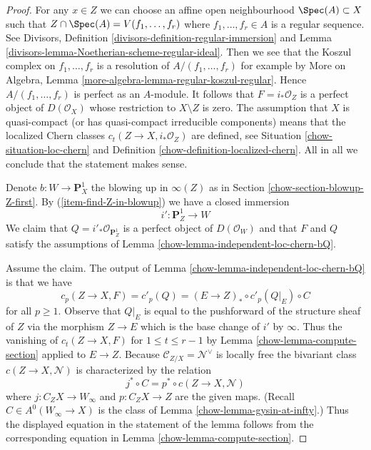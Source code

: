 \begin{proof}

For any $x \in Z$ we can choose an affine open neighbourhood
$\Spec(A) \subset X$ such that $Z \cap \Spec(A) = V(f_1, \ldots, f_r)$
where $f_1, \ldots, f_r \in A$ is a regular sequence.
See Divisors, Definition \ref{divisors-definition-regular-immersion} and
Lemma \ref{divisors-lemma-Noetherian-scheme-regular-ideal}.
Then we see that the Koszul complex on $f_1, \ldots, f_r$ is
a resolution of $A/(f_1, \ldots, f_r)$ for example by
More on Algebra, Lemma \ref{more-algebra-lemma-regular-koszul-regular}.
Hence $A/(f_1, \ldots, f_r)$ is perfect as an $A$-module.
It follows that $F = i_*\mathcal{O}_Z$ is a perfect object of
$D(\mathcal{O}_X)$ whose restriction to $X \setminus Z$ is zero.
The assumption that $X$ is quasi-compact (or has quasi-compact
irreducible components) means that the localized Chern classes
$c_t(Z \to X, i_*\mathcal{O}_Z)$ are defined, see
Situation \ref{chow-situation-loc-chern} and
Definition \ref{chow-definition-localized-chern}. All in all
we conclude that the statement makes sense.

\medskip\noindent
Denote $b : W \to \mathbf{P}^1_X$ the blowing up in $\infty(Z)$
as in Section \ref{chow-section-blowup-Z-first}. By (\ref{item-find-Z-in-blowup})
we have a closed immersion
$$
i' : \mathbf{P}^1_Z \longrightarrow W
$$
We claim that $Q = i'_*\mathcal{O}_{\mathbf{P}^1_Z}$
is a perfect object of
$D(\mathcal{O}_W)$ and that $F$ and $Q$ satisfy the assumptions of
Lemma \ref{chow-lemma-independent-loc-chern-bQ}.

\medskip\noindent
Assume the claim. The output of Lemma \ref{chow-lemma-independent-loc-chern-bQ}
is that we have
$$
c_p(Z \to X, F) = c'_p(Q) = (E \to Z)_* \circ c'_p(Q|_E) \circ C
$$
for all $p \geq 1$. Observe that $Q|_E$ is equal to the pushforward of
the structure sheaf of $Z$ via the morphism $Z \to E$ which is the
base change of $i'$ by $\infty$.
Thus the vanishing of $c_t(Z \to X, F)$ for $1 \leq t \leq r - 1$
by Lemma \ref{chow-lemma-compute-section} applied to $E \to Z$.
Because $\mathcal{C}_{Z/X} = \mathcal{N}^\vee$
is locally free the bivariant class $c(Z \to X, \mathcal{N})$
is characterized by the relation
$$
j^* \circ C = p^* \circ c(Z \to X, \mathcal{N})
$$
where $j : C_ZX \to W_\infty$ and $p : C_ZX \to Z$ are the given maps.
(Recall $C \in A^0(W_\infty \to X)$ is the class of
Lemma \ref{chow-lemma-gysin-at-infty}.)
Thus the displayed equation in the statement of the lemma
follows from the corresponding equation in Lemma \ref{chow-lemma-compute-section}.


\end{proof}
